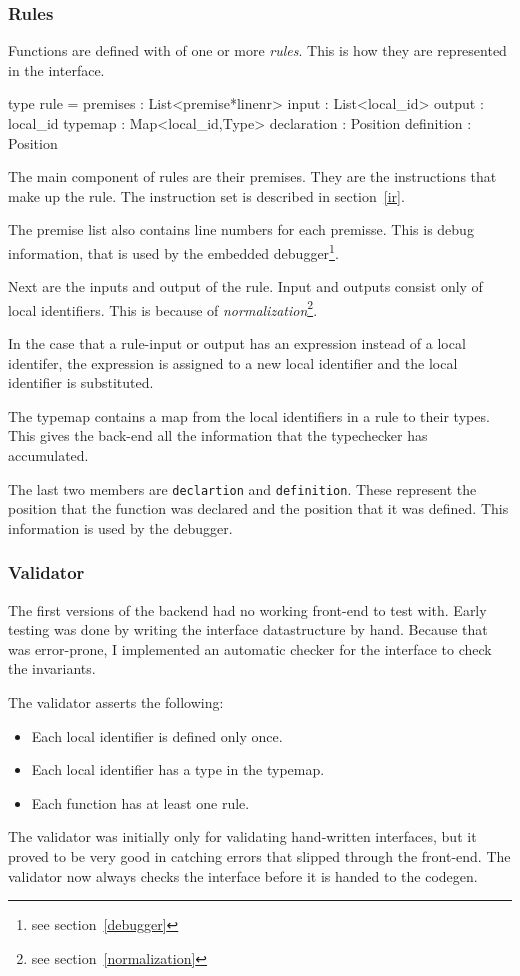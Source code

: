 \subsubsection{Rules}

Functions are defined with of one or more \textit{rules}.
This is how they are represented in the interface.

\begin{code}
type rule = {
  premises    : List<premise*linenr>
  input       : List<local_id>
  output      : local_id
  typemap     : Map<local_id,Type>
  declaration : Position
  definition  : Position
}
\end{code}

The main component of rules are their premises.
They are the instructions that make up the rule.
The instruction set is described in section~\ref{ir}.

The premise list also contains line numbers for each premisse.
This is debug information, that is used by the embedded debugger\footnote{see section~\ref{debugger}}.

Next are the inputs and output of the rule.
Input and outputs consist only of local identifiers.
This is because of \textit{normalization}\footnote{see section~\ref{normalization}}.

In the case that a rule-input or output has an expression instead of a local identifer,
 the expression is assigned to a new local identifier and the local identifier is substituted.

The typemap contains a map from the local identifiers in a rule to their types.
This gives the back-end all the information that the typechecker has accumulated.

The last two members are \verb|declartion| and \verb|definition|.
These represent the position that the function was declared and the position that it was defined.
This information is used by the debugger.

\subsubsection{Validator}
The first versions of the backend had no working front-end to test with.
Early testing was done by writing the interface datastructure by hand.
Because that was error-prone, I implemented an automatic checker for the interface to check the invariants.

The validator asserts the following:
\begin{itemize}
\item Each local identifier is defined only once.
\item Each local identifier has a type in the typemap.
\item Each function has at least one rule.
\end{itemize}

The validator was initially only for validating hand-written interfaces,
but it proved to be very good in catching errors that slipped through the front-end.
The validator now always checks the interface before it is handed to the codegen.

